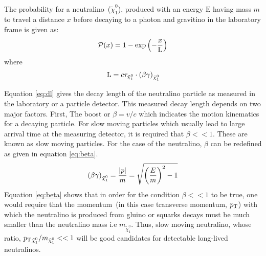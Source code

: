 {\paragraph*{}
The probability for a neutralino~($\tilde{\chi}^{0}_{1}$), produced with an energy $\displaystyle{\mathrm{E}}$ having mass $m$ to travel a distance $x$ before decaying to a photon and gravitino in the laboratory frame is given as:
\begin{equation}{\label{eq:prop}}
\displaystyle{\mathcal{P}(x) = 1 - \exp{\left(- \frac{x}{\mathrm{L}} \right)} }
\end{equation}
where
\begin{equation}{\label{eq:dl}}
\displaystyle{\mathrm{L} = c\tau_{\tilde{\chi}^{0}_{1}}\cdot\left(\beta\gamma\right)_{\tilde{\chi}^{0}_{1}}}
\end{equation}

Equation \ref{eq:dl} gives the decay length of the neutralino particle as measured in the laboratory or a particle detector. This measured decay length depends on two major factors. First, The boost or $\beta = v/c$ which indicates the motion kinematics for a decaying particle. For slow moving particles which usually lead to large arrival time at the measuring detector, it is required that $\beta << 1$. These are known as slow moving particles. For the case of the neutralino, $\beta$ can be redefined as given in equation \ref{eq:beta}.
\begin{equation}{\label{eq:beta}}
\displaystyle{\left(\beta\gamma\right)_{\tilde{\chi}^{0}_{1}} = \frac{|p|}{m} = \sqrt{\left(\frac{E}{m}\right)^{2} - 1} }
\end{equation}
Equation \ref{eq:beta} shows that in order for the condition $\beta << 1$ to be true, one
would require that the momentum~(in this case transverse momentum, $p_{\mathrm{T}}$) with which the neutralino is produced from gluino or squarks decays must be much smaller than the neutralino mass i.e  $m_{\tilde{\chi}^{0}_{1}}$. Thus, slow moving neutralino, whose ratio, $p_{\mathrm{T}}{_{\tilde{\chi}^{0}_{1}}}/m_{\tilde{\chi}^{0}_{1}} << 1$  will be good candidates for detectable long-lived neutralinos.

}
